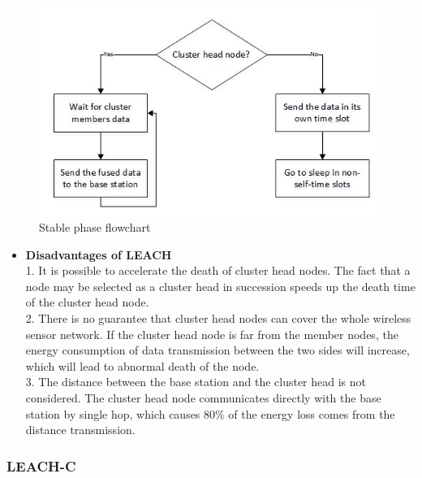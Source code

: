 \documentclass[11pt]{report}
\begin{document}
\begin{itemize}
		\begin{figure}[h!]
			\centering
			\includegraphics[width=0.6\linewidth]{phaseflowchart.jpg}
			\caption{Stable phase flowchart}
			\label{}
		\end{figure}
	\end{itemize}

	\begin{itemize}
		\item \textbf{Disadvantages of LEACH}\\
		
		1. It is possible to accelerate the death of cluster head nodes. The fact that a node may be selected as a cluster head in succession speeds up the death time of the cluster head node.\\
		
		2. There is no guarantee that cluster head nodes can cover the whole wireless sensor network. If the cluster head node is far from the member nodes, the energy consumption of data transmission between the two sides will increase, which will lead to abnormal death of the node. \\
		
		3. The distance between the base station and the cluster head is not considered. The cluster head node communicates directly with the base station by single hop, which causes  80\% of the energy loss comes from the distance transmission. 
	\end{itemize}
	

	\subsubsection{LEACH-C}
	
\end{document}
